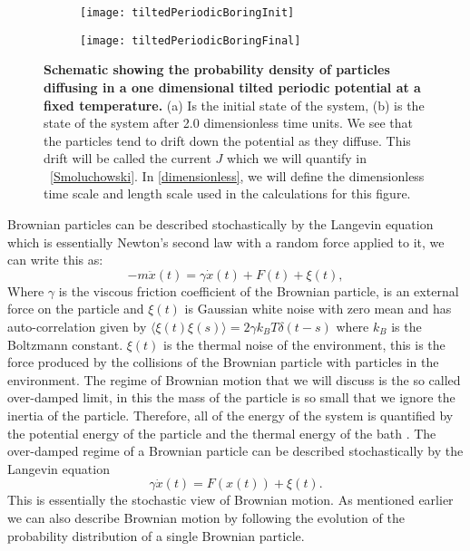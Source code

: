 \begin{figure}[tb]
	\begin{subfigure}{0.49\textwidth}
		\texttt{[image: tiltedPeriodicBoringInit]}
		\caption{\label{fig:Init}}
	\end{subfigure}
\begin{subfigure}{0.49\textwidth}
		\texttt{[image: tiltedPeriodicBoringFinal]}
		\caption{\label{fig:Final}}
\end{subfigure}
\caption{\textbf{Schematic showing the probability density of particles diffusing in a one dimensional tilted periodic potential at a fixed temperature.} (a) Is the initial state of the system, (b) is the state of the system after 2.0 dimensionless time units. We see that the particles tend to drift down the potential as they diffuse. This drift will be called the current $J$ which we will quantify in ~\autoref{Smoluchowski}. In \autoref{dimensionless}, we will define the dimensionless time scale and length scale used in the calculations for this figure.}
\label{fig:Schematic}
\end{figure}

Brownian particles can be described stochastically by the Langevin equation which is essentially Newton's second law with a random force applied to it, we can write this as:
\begin{equation}
-m \ddot{x}(t) = \gamma \dot{x} (t) + F(t) + \xi(t), 
\end{equation}
Where $\gamma$ is the viscous friction coefficient of the Brownian particle, is an external force on the particle and $\xi(t)$ is Gaussian white noise with zero mean and has auto-correlation given by $\langle \xi(t) \xi(s) \rangle = 2 \gamma k_B T \delta(t - s)$ where $k_B$ is the Boltzmann constant. $\xi(t)$ is the thermal noise of the environment, this is the force produced by the collisions of the Brownian particle with particles in the environment.
The regime of Brownian motion that we will discuss is the so called over-damped limit, in this the mass of the particle is so small that we ignore the inertia of the particle. Therefore, all of the energy of the system is quantified by the potential energy of the particle and the thermal energy of the bath \cite{Streater1997,Streater1997a,Streater2000,Streater1997b}. The over-damped regime of a Brownian particle can be described stochastically by the Langevin equation 
\begin{equation}
	\gamma \dot x(t) = F(x(t)) + \xi(t).  \label{eqn:langevin}
\end{equation}
This is essentially the stochastic view of Brownian motion. As mentioned earlier we can also describe Brownian motion by following the evolution of the probability distribution of a single Brownian particle.

